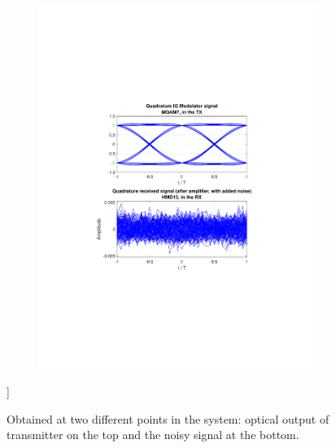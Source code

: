 \begin{refsection}
\begin{figure}[H]
\begin{minipage}{\linewidth}
\begin{subfigure}{.45\textwidth}
	\end{subfigure}
	\begin{subfigure}{.45\textwidth}
		\centering
		\includegraphics[clip, trim=4cm 7cm 4cm 7cm, 
		width=\textwidth]{./sdf/m_qam_system/figures/eyes/simulRc09Sp60Np60_q.pdf}
	\end{subfigure}
	
	\caption{
		Obtained
		at two different points in the system: optical output of transmitter on the top and
		the noisy signal at the bottom.
		\label{fig:eyes_n_rc_60_09}}
	\end{minipage}]
\end{figure}

\begin{table}[H]
	\centering
	

\end{table}
\end{refsection}
